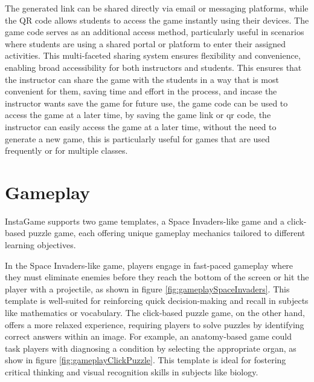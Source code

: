 The generated link can be shared directly via email or messaging platforms, while the QR code allows students to access the game instantly using their devices. The game code serves as an additional access method, particularly useful in scenarios where students are using a shared portal or platform to enter their assigned activities. This multi-faceted sharing system ensures flexibility and convenience, enabling broad accessibility for both instructors and students. This ensures that the instructor can share the game with the students in a way that is most convenient for them, saving time and effort in the process, and incase the instructor wants save the game for future use, the game code can be used to access the game at a later time, by saving the game link or qr code, the instructor can easily access the game at a later time, without the need to generate a new game, this is particularly useful for games that are used frequently or for multiple classes.


\section{Gameplay}

InstaGame supports two game templates, a Space Invaders-like game and a click-based puzzle game, each offering unique gameplay mechanics tailored to different learning objectives.

In the Space Invaders-like game, players engage in fast-paced gameplay where they must eliminate enemies before they reach the bottom of the screen or hit the player with a projectile, as shown in figure \ref{fig:gameplaySpaceInvaders}. This template is well-suited for reinforcing quick decision-making and recall in subjects like mathematics or vocabulary. The click-based puzzle game, on the other hand, offers a more relaxed experience, requiring players to solve puzzles by identifying correct answers within an image. For example, an anatomy-based game could task players with diagnosing a condition by selecting the appropriate organ, as show in figure \ref{fig:gameplayClickPuzzle}. This template is ideal for fostering critical thinking and visual recognition skills in subjects like biology.

